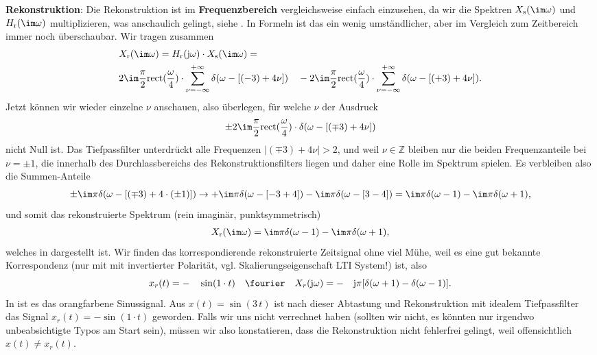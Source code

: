 \begin{Loesung}
\textbf{Rekonstruktion}:
Die Rekonstruktion ist im \textbf{Frequenzbereich} vergleichsweise einfach einzusehen,
da wir die Spektren $X_\mathrm{s}(\im\omega)$ und $H_\mathrm{r}(\im\omega)$
multiplizieren, was anschaulich gelingt, siehe
.
In Formeln ist das ein wenig umständlicher, aber im Vergleich zum Zeitbereich immer
noch überschaubar. Wir tragen zusammen
\begin{align}
&X_\mathrm{r}(\im\omega) =
H_\mathrm{r}(\mathrm{j}\omega) \cdot X_\mathrm{s}(\im\omega) =\\
&2\im
\frac{\pi}{2}\mathrm{rect}(\frac{\omega}{4}) \cdot \sum_{\nu=-\infty}^{+\infty} \delta(\omega - [(-3)+4\nu])
\quad-
2\im
\frac{\pi}{2}\mathrm{rect}(\frac{\omega}{4}) \cdot \sum_{\nu=-\infty}^{+\infty} \delta(\omega - [(+3)+4\nu]).
\end{align}
%
Jetzt können wir wieder einzelne $\nu$ anschauen, also überlegen, für welche $\nu$
der Ausdruck
\begin{equation}
\pm 2\im \frac{\pi}{2}\mathrm{rect}(\frac{\omega}{4}) \cdot \delta(\omega - [(\mp 3)+4\nu])
\end{equation}
nicht Null ist. Das Tiefpassfilter unterdrückt alle Frequenzen $|(\mp 3)+4\nu|>2$,
und weil $\nu\in\mathbb{Z}$ bleiben nur die beiden Frequenzanteile bei $\nu=\pm 1$,
die innerhalb des Durchlassbereichs des Rekonstruktionsfilters liegen
und daher eine Rolle im Spektrum spielen. Es verbleiben also die Summen-Anteile
\begin{equation}
\pm \im \pi  \delta(\omega - [(\mp 3)+4 \cdot (\pm 1)]) \rightarrow
+ \im \pi  \delta(\omega - [-3+4]) - \im \pi  \delta(\omega - [3-4])=
\im \pi  \delta(\omega - 1) - \im \pi  \delta(\omega + 1),
\end{equation}
und somit das rekonstruierte Spektrum (rein imaginär, punktsymmetrisch)
\begin{align}
X_\mathrm{r}(\im\omega) = \im \pi  \delta(\omega - 1) - \im \pi  \delta(\omega + 1),
\end{align}
welches in  dargestellt ist.
Wir finden das korrespondierende rekonstruierte Zeitsignal ohne viel Mühe, weil
es eine gut bekannte Korrespondenz (nur mit mit invertierter Polarität, vgl.
Skalierungseigenschaft LTI System!) ist, also
\begin{equation}
x_r(t) = -\quad\sin(1\cdot t) \quad\fourier\quad X_r(\mathrm{j} \omega) =
 -\quad\mathrm{j} \pi [\delta(\omega+1) - \delta(\omega-1)].
\end{equation}
In  ist es das orangfarbene Sinussignal.
Aus $x(t)=\sin(3\,t)$ ist nach dieser Abtastung und Rekonstruktion mit idealem
Tiefpassfilter das Signal $x_r(t) = -\sin(1\cdot t)$ geworden. Falls wir uns nicht verrechnet
haben (sollten wir nicht, es könnten nur irgendwo unbeabsichtigte Typos am Start sein),
müssen wir also konstatieren, dass die Rekonstruktion nicht fehlerfrei gelingt,
weil offensichtlich $x(t) \neq x_r(t)$.


\end{Loesung}
